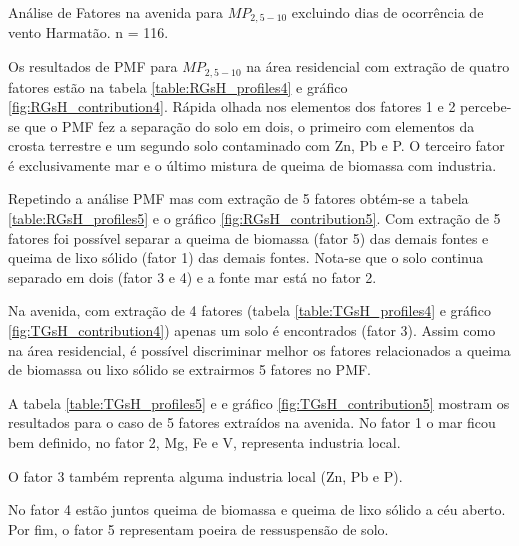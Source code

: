 \begin{table}[H]
  \centering
  
  \caption{Análise de Fatores na avenida para $MP_{2,5-10}$
           excluindo dias de ocorrência de vento Harmatão. n = 116.
          \label{table:AF_TGsH5}}
\end{table}
\newpage

Os resultados de PMF para $MP_{2,5-10}$ na área residencial com extração de 
quatro fatores estão na tabela \ref{table:RGsH_profiles4} e gráfico 
\ref{fig:RGsH_contribution4}. Rápida olhada nos elementos dos fatores 1 e 2 
percebe-se que o PMF fez a separação do solo em dois, o primeiro com elementos
da crosta terrestre e um segundo solo contaminado com Zn, Pb e P. O terceiro 
fator é exclusivamente mar e o último mistura de queima de biomassa 
com industria. 

Repetindo a análise PMF mas com extração de 5 fatores obtém-se a tabela 
\ref{table:RGsH_profiles5} e o gráfico \ref{fig:RGsH_contribution5}.
Com extração de 5 fatores foi possível separar a queima de biomassa (fator 5)
das demais fontes e queima de lixo sólido (fator 1) das demais fontes. 
Nota-se que o solo continua separado em dois (fator 3 e 4) e a fonte mar está 
no fator 2. 

Na avenida, com extração de 4 fatores (tabela \ref{table:TGsH_profiles4} 
e gráfico \ref{fig:TGsH_contribution4}) apenas um solo é encontrados
(fator 3). Assim como na área residencial, é possível discriminar melhor 
os fatores relacionados a queima de biomassa ou lixo sólido se extrairmos 5
fatores no PMF. 

A tabela \ref{table:TGsH_profiles5} e e gráfico \ref{fig:TGsH_contribution5} 
mostram os resultados para o caso de 5 fatores extraídos na avenida. 
No fator 1 o mar ficou
bem definido, no fator 2, Mg, Fe e V, representa industria local. 

O fator 3 também reprenta alguma industria local (Zn, Pb e P).

No fator 4 estão juntos queima de biomassa e queima de lixo sólido a céu aberto. 
Por fim, o fator 5 representam poeira de ressuspensão de solo.  

